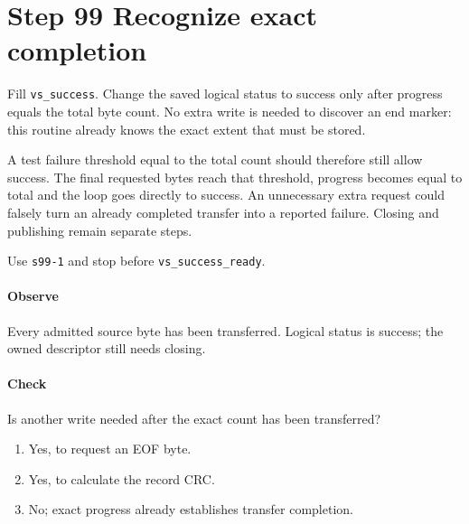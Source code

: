 \section{Step 99 Recognize exact completion}
Fill \texttt{vs\_success}. Change the saved logical status to success only after progress equals the total byte count. No extra write is needed to discover an end marker: this routine already knows the exact extent that must be stored.

A test failure threshold equal to the total count should therefore still allow success. The final requested bytes reach that threshold, progress becomes equal to total and the loop goes directly to success. An unnecessary extra request could falsely turn an already completed transfer into a reported failure. Closing and publishing remain separate steps.

Use \texttt{s99-1} and stop before \texttt{vs\_success\_ready}.

\paragraph{Observe} Every admitted source byte has been transferred. Logical status is success; the owned descriptor still needs closing.

\paragraph{Check} Is another write needed after the exact count has been transferred?
\begin{enumerate}[label=\Alph*.]
  \item Yes, to request an EOF byte.
  \item Yes, to calculate the record CRC.
  \item No; exact progress already establishes transfer completion.
\end{enumerate}
